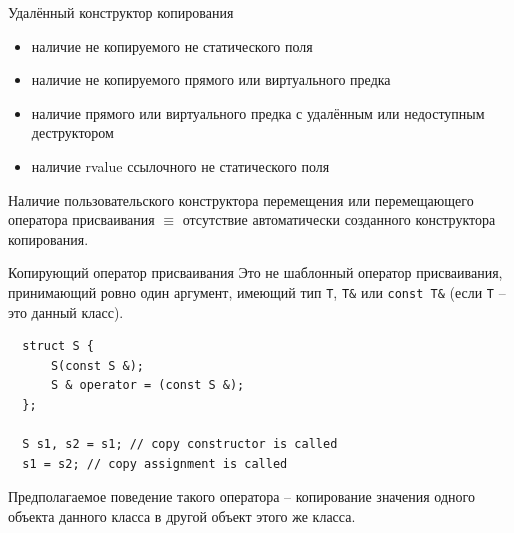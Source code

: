 \documentclass[unknownkeysallowed,xcolor=table]{beamer}
\begin{document}
\begin{frame}{Удалённый конструктор копирования}
  \begin{itemize}
    \item наличие не копируемого не статического поля \vspace{0.5em}
    \item наличие не копируемого прямого или виртуального предка \vspace{0.5em}
    \item наличие прямого или виртуального предка с удалённым или недоступным деструктором \vspace{0.5em}
    \item наличие rvalue ссылочного не статического поля
  \end{itemize}

  \vspace{1em}

  Наличие пользовательского конструктора перемещения или перемещающего оператора присваивания $\equiv$ отсутствие автоматически созданного конструктора копирования.
\end{frame}

\begin{frame}[fragile]{Копирующий оператор присваивания}
  Это не шаблонный оператор присваивания, принимающий ровно один аргумент, имеющий тип \lstinline{T}, \lstinline{T&} или \lstinline{const T&} (если \lstinline{T} -- это данный класс).

  \vspace{1em}

  \begin{lstlisting}
  struct S {
      S(const S &);
      S & operator = (const S &);
  };

  S s1, s2 = s1; // copy constructor is called
  s1 = s2; // copy assignment is called
  \end{lstlisting}

  \vspace{1em}

  Предполагаемое поведение такого оператора -- копирование значения одного объекта данного класса в другой объект этого же класса.
\end{frame}
\end{document}
